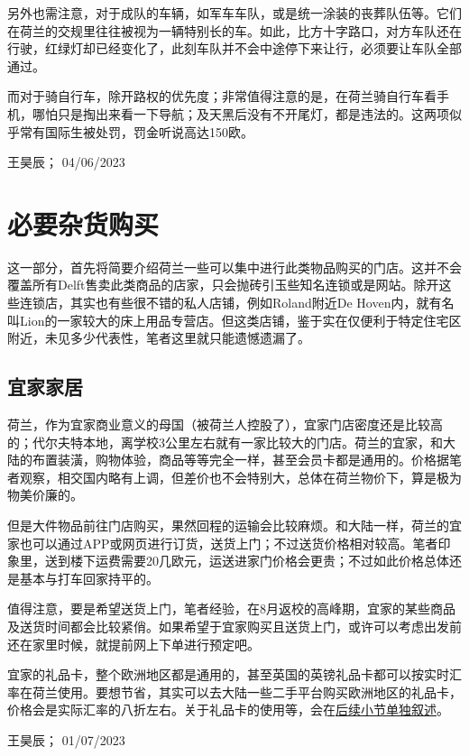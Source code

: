 另外也需注意，对于成队的车辆，如军车车队，或是统一涂装的丧葬队伍等。它们在荷兰的交规里往往被视为一辆特别长的车。如此，比方十字路口，对方车队还在行驶，红绿灯却已经变化了，此刻车队并不会中途停下来让行，必须要让车队全部通过。

而对于骑自行车，除开路权的优先度；非常值得注意的是，在荷兰骑自行车看手机，哪怕只是掏出来看一下导航；及天黑后没有不开尾灯，都是违法的。这两项似乎常有国际生被处罚，罚金听说高达150欧。
\begin{flushright}
王昊辰； 04/06/2023
\end{flushright}

\vspace{\betsubsec} %
\section{必要杂货购买}
这一部分，首先将简要介绍荷兰一些可以集中进行此类物品购买的门店。这并不会覆盖所有Delft售卖此类商品的店家，只会抛砖引玉些知名连锁或是网站。除开这些连锁店，其实也有些很不错的私人店铺，例如Roland附近De Hoven内，就有名叫Lion的一家较大的床上用品专营店。但这类店铺，鉴于实在仅便利于特定住宅区附近，未见多少代表性，笔者这里就只能遗憾遗漏了。


\subsection{宜家家居}
荷兰，作为宜家商业意义的母国（被荷兰人控股了），宜家门店密度还是比较高的；代尔夫特本地，离学校3公里左右就有一家比较大的门店。荷兰的宜家，和大陆的布置装潢，购物体验，商品等等完全一样，甚至会员卡都是通用的。价格据笔者观察，相交国内略有上调，但差价也不会特别大，总体在荷兰物价下，算是极为物美价廉的。

但是大件物品前往门店购买，果然回程的运输会比较麻烦。和大陆一样，荷兰的宜家也可以通过APP或网页进行订货，送货上门；不过送货价格相对较高。笔者印象里，送到楼下运费需要20几欧元，运送进家门价格会更贵；不过如此价格总体还是基本与打车回家持平的。

值得注意，要是希望送货上门，笔者经验，在8月返校的高峰期，宜家的某些商品及送货时间都会比较紧俏。如果希望于宜家购买且送货上门，或许可以考虑出发前还在家里时候，就提前网上下单进行预定吧。

宜家的礼品卡，整个欧洲地区都是通用的，甚至英国的英镑礼品卡都可以按实时汇率在荷兰使用。要想节省，其实可以去大陆一些二手平台购买欧洲地区的礼品卡，价格会是实际汇率的八折左右。关于礼品卡的使用等，会在\hyperlink{礼品卡}{\uline{后续小节单独叙述}}。
\begin{flushright}
王昊辰； 01/07/2023
\end{flushright}

